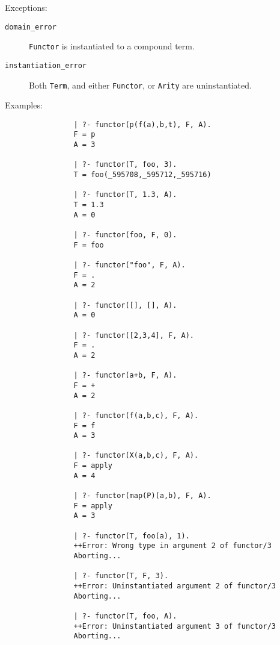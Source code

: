 \begin{description}
    Exceptions:
    \begin{description}
    \item[{\tt domain\_error}]
	{\tt Functor} is instantiated to a compound term.
    \item[{\tt instantiation\_error}]
	Both {\tt Term}, and either {\tt Functor}, or {\tt Arity} are 
	uninstantiated.
    \end{description}

    Examples:
    {\footnotesize
     \begin{verbatim}
                | ?- functor(p(f(a),b,t), F, A).
                F = p
                A = 3

                | ?- functor(T, foo, 3).
                T = foo(_595708,_595712,_595716)

                | ?- functor(T, 1.3, A).
                T = 1.3
                A = 0

                | ?- functor(foo, F, 0).
                F = foo

                | ?- functor("foo", F, A).
                F = .
                A = 2

                | ?- functor([], [], A).
                A = 0

                | ?- functor([2,3,4], F, A).
                F = .
                A = 2

                | ?- functor(a+b, F, A).
                F = +
                A = 2

                | ?- functor(f(a,b,c), F, A).
                F = f
                A = 3

                | ?- functor(X(a,b,c), F, A).
                F = apply
                A = 4

                | ?- functor(map(P)(a,b), F, A).
                F = apply
                A = 3

                | ?- functor(T, foo(a), 1).
                ++Error: Wrong type in argument 2 of functor/3
                Aborting...

                | ?- functor(T, F, 3).
                ++Error: Uninstantiated argument 2 of functor/3
                Aborting...

                | ?- functor(T, foo, A).
                ++Error: Uninstantiated argument 3 of functor/3
                Aborting...
     \end{verbatim}}


\end{description}
